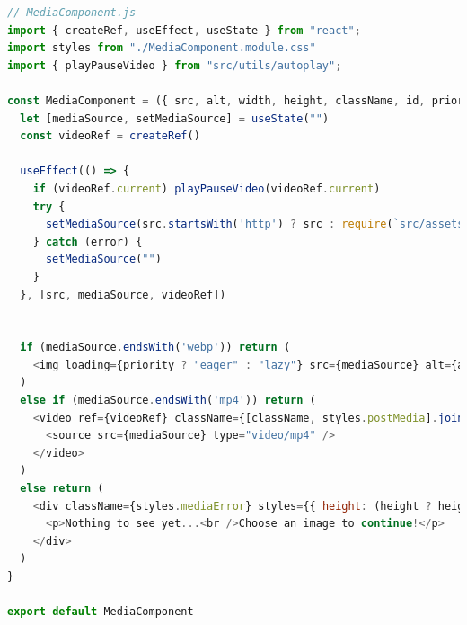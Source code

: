 \documentclass[a4paper, 12pt]{article}
\begin{document}
\begin{lstlisting}[caption=MediaComponent in React, label={lst:React:MediaComponent}, language=JavaScript, escapechar=°]
// MediaComponent.js
import { createRef, useEffect, useState } from "react";
import styles from "./MediaComponent.module.css"
import { playPauseVideo } from "src/utils/autoplay";

const MediaComponent = ({ src, alt, width, height, className, id, priority = false }) => {
  let [mediaSource, setMediaSource] = useState("")
  const videoRef = createRef()

  useEffect(() => {
    if (videoRef.current) playPauseVideo(videoRef.current)
    try {
      setMediaSource(src.startsWith('http') ? src : require(`src/assets/stock-footage/${src}`))°\label{line:React:MediaComponent:imageImport}°
    } catch (error) {
      setMediaSource("")
    }
  }, [src, mediaSource, videoRef])


  if (mediaSource.endsWith('webp')) return (
    <img loading={priority ? "eager" : "lazy"} src={mediaSource} alt={alt} width={width} height={height} className={[className, styles.postMedia].join(" ")} id={id} />
  )
  else if (mediaSource.endsWith('mp4')) return (
    <video ref={videoRef} className={[className, styles.postMedia].join(" ")} id={id} width={width} preload="metadata" controls controlsList="nodownload,nofullscreen,noremoteplayback" disablePictureInPicture loop muted >
      <source src={mediaSource} type="video/mp4" />
    </video>
  )
  else return (
    <div className={styles.mediaError} styles={{ height: (height ? height + 'px' : '300px'), width: width.endsWith("%") ? width : width + "px" }}>
      <p>Nothing to see yet...<br />Choose an image to continue!</p>
    </div>
  )
}

export default MediaComponent
\end{lstlisting}



\end{document}
